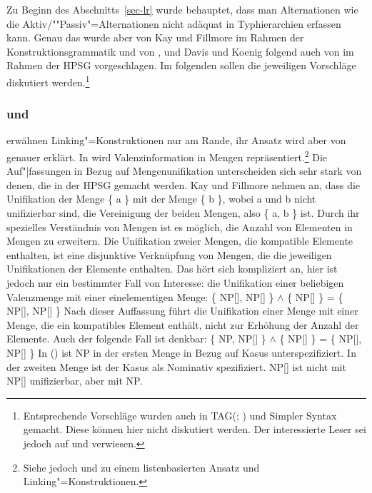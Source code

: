 Zu Beginn des Abschnitts~\ref{sec-lr} wurde behauptet, dass man Alternationen wie die
Aktiv/""Passiv"=Alternationen nicht adäquat in Typhierarchien erfassen kann. 
Genau das wurde aber von Kay und Fillmore im Rahmen der Konstruktionsgrammatik und 
von \citet{Koenig99a}, \citet{DK2000b-u} und Davis und Koenig folgend
auch von \citet{Kordoni2001b-u} im Rahmen der HPSG vorgeschlagen. Im
folgenden sollen die jeweiligen Vorschläge diskutiert werden.\footnote{
  Entsprechende Vorschläge wurden auch in TAG\indextag (\citealp{Candito96a}; \citealp[]{CK2003a-u}) und Simpler Syntax \citep[Kapitel~6.3]{CJ2005a} gemacht. Diese können hier nicht diskutiert werden. Der interessierte Leser sei jedoch auf  und  verwiesen.
}

\subsubsection{\citet{KF99a} und \citet{MR2001a}}
\label{cxg-linking-konstruktionen}

\mbox{}\citet[]{KF99a}  erwähnen Linking"=Konstruktionen nur am Rande, ihr Ansatz wird aber
von \citet[Kapitel~4]{MR2001a} genauer erklärt. In  wird Valenzinformation
in Mengen repräsentiert.\footnote{
  Siehe jedoch  und  zu einem listenbasierten Ansatz und
  Linking"=Konstruktionen.
}
Die Auf"|fassungen in Bezug auf Mengenunifikation unterscheiden sich sehr
stark von denen, die in der HPSG gemacht werden. Kay und Fillmore nehmen an, dass
die Unifikation der Menge \{ a \} mit der Menge \{ b \}, wobei a und b nicht unifizierbar sind,
die Vereinigung der beiden Mengen, also \{ a, b \} ist.
Durch ihr spezielles Verständnis von Mengen ist es möglich, die Anzahl von Elementen in Mengen
zu erweitern. Die Unifikation zweier Mengen, die kompatible Elemente enthalten, ist eine disjunktive
Verknüpfung von Mengen, die die jeweiligen Unifikationen der Elemente enthalten. Das hört sich kompliziert
an, hier ist jedoch nur ein bestimmter Fall von Interesse: die Unifikation einer beliebigen
Valenzmenge mit einer einelementigen Menge:
\ea
\{ NP[\nom], NP[\acc] \} $\wedge$ \{ NP[\nom] \} = \{ NP[\nom], NP[\acc] \}
\z
Nach dieser Auffassung führt die Unifikation einer Menge mit einer Menge, die ein kompatibles
Element enthält, nicht zur Erhöhung der Anzahl der Elemente. Auch der folgende Fall ist denkbar:
\ea
\{ NP, NP[\acc] \} $\wedge$ \{ NP[\nom] \} = \{ NP[\nom], NP[\acc] \}
\z
In () ist NP in der ersten Menge in Bezug auf Kasus unterspezifiziert. In der zweiten Menge
ist der Kasus als Nominativ spezifiziert. NP[\nom] ist nicht mit  NP[\acc] unifizierbar, aber mit NP.

